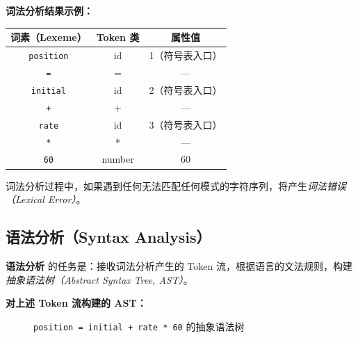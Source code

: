 \documentclass[12pt,a4paper]{ctexart}
\newcommand{\term}[1]{\textbf{\textcolor{mainblue}{#1}}}
\begin{document}
\textbf{词法分析结果示例：}

\begin{center}
\begin{tabular}{@{}c|c|c@{}}
\toprule
\textbf{词素（Lexeme）} & \textbf{Token 类} & \textbf{属性值} \\
\midrule
\texttt{position} & id  & 1（符号表入口）\\
\texttt{=}        & =   & — \\
\texttt{initial}  & id  & 2（符号表入口）\\
\texttt{+}        & +   & — \\
\texttt{rate}     & id  & 3（符号表入口）\\
\texttt{*}        & *   & — \\
\texttt{60}       & number & 60 \\
\bottomrule
\end{tabular}
\end{center}

\begin{warnbox}
  词法分析过程中，如果遇到任何无法匹配任何模式的字符序列，将产生\emph{词法错误（Lexical Error）}。
\end{warnbox}

\subsection{语法分析（Syntax Analysis）}

\begin{keybox}
  \term{语法分析} 的任务是：接收词法分析产生的 Token 流，根据语言的文法规则，构建\emph{抽象语法树（Abstract Syntax Tree, AST）}。
\end{keybox}

\textbf{对上述 Token 流构建的 AST：}

\begin{figure}[h]
\centering
{}
\caption{\texttt{position = initial + rate * 60} 的抽象语法树}
\label{fig:ast}
\end{figure}
\end{document}
